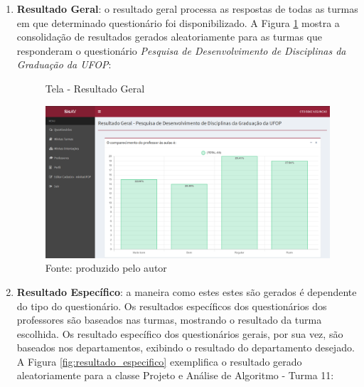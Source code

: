 \documentclass[
  12pt,       %
  openright,      %
  oneside,      %
  a4paper,      %
  english,      %
  french,        %
  spanish,     %
  brazil        %
  ]{abntex2-decsi}
\begin{document}
            \begin{enumerate}

            \item \textbf{Resultado Geral}: o resultado geral processa as respostas de todas as turmas em que determinado questionário foi disponibilizado. A Figura \ref{fig:resultado_geral} mostra a consolidação de resultados gerados aleatoriamente para as turmas que responderam o questionário \textit{Pesquisa de Desenvolvimento de Disciplinas da Graduação da UFOP}:
            
            \begin{figure}[h]
                \centering
                \caption{Tela - Resultado Geral}
                \includegraphics[width=1\textwidth]{img/resultado_geral}
                \caption*{Fonte: produzido pelo autor}
                \label{fig:resultado_geral}
   		 	\end{figure}

            \item \textbf{Resultado Específico}: a maneira como estes estes são gerados é dependente do tipo do questionário. Os resultados específicos dos questionários dos professores são baseados nas turmas, mostrando o resultado da turma escolhida. Os resultado específico dos questionários gerais, por sua vez, são baseados nos departamentos, exibindo o resultado do departamento desejado. A Figura \ref{fig:resultado_especifico} exemplifica o resultado gerado aleatoriamente para a classe Projeto e Análise de Algoritmo - Turma 11:
            
            \newpage
            

\end{enumerate}
\end{document}
